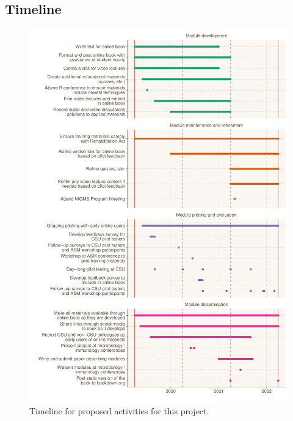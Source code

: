 \documentclass[pdftex,english,11pt,parskip=half]{scrartcl}
\begin{document}
\clearpage

\subsection{Timeline}

\begin{figure}[ht]
    \centering
    \includegraphics[width=\textwidth]{figures/timeline.pdf}
    \caption{Timeline for proposed activities for this project.}
    \label{fig:timeline}
\end{figure}

\clearpage



\end{document}
